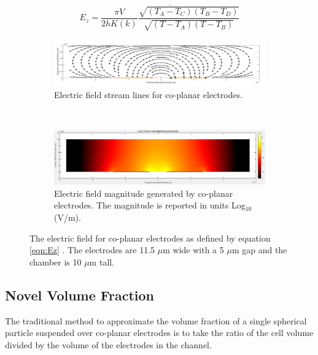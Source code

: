 \begin{equation}
    E_z = \overline{\frac{\pi V}{2hK(k)} \frac{\sqrt{(T_A-T_C)(T_B-T_D)}}{\sqrt{(T-T_A)(T-T_B)}}}
    \label{eqn:Ez}
 \end{equation}
 
    
     \begin{figure}[h]
    \centering
    \begin{subfigure}[b]{\textwidth}
        \centering
        \includegraphics[width=\textwidth]{images/electricFieldStreamLines.png}
        \caption{Electric field stream lines for co-planar electrodes.}
        \label{fig:electricFieldStreamLines}
    \end{subfigure}
    \\
    \vspace{0.2 in}
    \begin{subfigure}[b]{\textwidth}
        \centering
        \includegraphics[width=\textwidth]{images/EfieldMagnitude.png}
        \caption{Electric field magnitude generated by co-planar electrodes. The magnitude is reported in units Log$_{10}$(V/m).}
        \label{fig:electricFieldMag}
    \end{subfigure} 
    \caption[Electric Field of Co-planar Electrodes]{The electric field for co-planar electrodes as defined by equation \ref{eqn:Ez} . The electrodes are 11.5 $\mu$m wide with a 5 $\mu$m gap and the chamber is 10 $\mu$m tall.}
    \label{fig:electricFieldPlots}
 \end{figure}

\subsection{Novel Volume Fraction}
\par The traditional method to approximate the volume fraction of a single spherical particle suspended over co-planar electrodes is to take the ratio of the cell volume divided by the volume of the electrodes in the channel.

